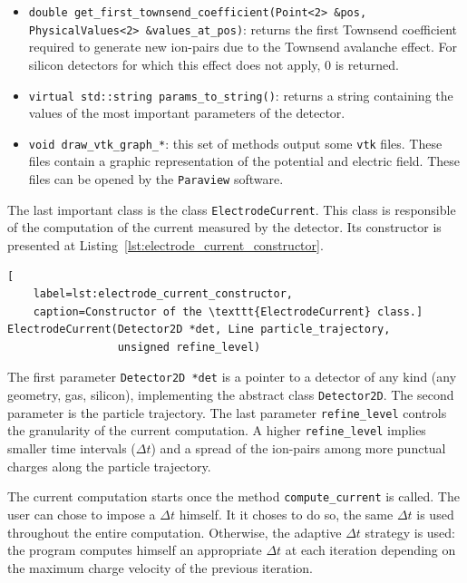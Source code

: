 \documentclass[11pt]{article}
\begin{document}
\begin{itemize}
		\item \lstinline{double get_first_townsend_coefficient(Point<2> &pos, PhysicalValues<2> &values_at_pos)}:
		returns the first Townsend coefficient required to generate new ion-pairs due
		to the Townsend avalanche effect. For silicon detectors for which this effect
		does not apply, 0 is returned.

		\item \lstinline{virtual std::string params_to_string()}: returns a string
		containing the values of the most important parameters of the detector.

		\item \lstinline{void draw_vtk_graph_*}: this set of methods output some \texttt{vtk}
		files. These files contain a graphic representation of the potential and
		electric field. These files can be opened by the \texttt{Paraview} software.
	\end{itemize}

The last important class is the class \texttt{ElectrodeCurrent}. This class
is responsible of the computation of the current measured by the detector. Its
constructor is presented at Listing~\ref{lst:electrode_current_constructor}.
\newline

\begin{lstlisting}[
	label=lst:electrode_current_constructor,
	caption=Constructor of the \texttt{ElectrodeCurrent} class.]
ElectrodeCurrent(Detector2D *det, Line particle_trajectory,
                 unsigned refine_level)
\end{lstlisting}

The first parameter \texttt{Detector2D *det} is a pointer to a detector of
any kind (any geometry, gas, silicon), implementing the abstract class \texttt{Detector2D}.
The second parameter is the particle trajectory. The last parameter \texttt{refine\_level}
controls the granularity of the current computation. A higher \texttt{refine\_level}
implies smaller time intervals ($\Delta t$) and a spread of the ion-pairs among
more punctual charges along the particle trajectory.

The current computation starts once the method \texttt{compute\_current} is called.
The user can chose to impose a $\Delta t$ himself. It it choses to do so, the
same $\Delta t$ is used throughout the entire computation. Otherwise,
the adaptive $\Delta t$ strategy is used: the program computes himself an
appropriate $\Delta t$ at each iteration depending on the maximum charge velocity
of the previous iteration.
\end{document}
